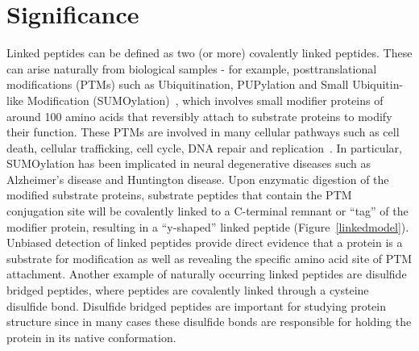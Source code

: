 \documentclass[arial,11pt]{article}
\begin{document}
\section{Significance}
Linked peptides can be defined as two (or more) covalently linked peptides. These can arise naturally from biological samples \-- for example, posttranslational modifications (PTMs) such as Ubiquitination, PUPylation and Small Ubiquitin-like Modification (SUMOylation)~\cite{pickart2001mechanisms,hochstrasser2009origin,geiss2007concepts}, which involves small modifier proteins of around 100 amino acids that reversibly attach to substrate proteins to modify their function. These PTMs are involved in many cellular pathways such as cell death, cellular trafficking, cell cycle, DNA repair and replication~\cite{meulmeester2008cell}. In particular, SUMOylation has been implicated in neural degenerative diseases such as Alzheimer's disease  and Huntington disease\cite{zhang2008sumoylation,steffan2004sumodis}. Upon enzymatic digestion of the modified substrate proteins, substrate peptides that contain the PTM conjugation site will be covalently linked to a C-terminal remnant or ``tag'' of the modifier protein, resulting in a ``y-shaped'' linked peptide (Figure~\ref{linkedmodel}). Unbiased detection of linked peptides provide direct evidence that a protein is a substrate for modification as well as revealing the specific amino acid site of PTM attachment. Another example of naturally occurring linked peptides are disulfide bridged peptides, where peptides are covalently linked through a cysteine disulfide bond.  Disulfide bridged peptides are important for studying protein structure since in many cases these disulfide bonds are responsible for holding the protein in its native conformation.
\end{document}
